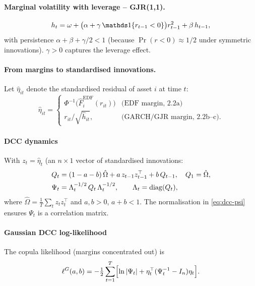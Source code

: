 \paragraph{Marginal volatility with leverage -- GJR(1,1).}
\begin{equation}\label{eq:gjr}
h_t=\omega+\bigl(\alpha+\gamma\,\indic\{r_{t-1}<0\}\bigr)r_{t-1}^{2}+\beta\,h_{t-1},
\end{equation}
with persistence $\alpha+\beta+\gamma/2<1$ (because $\Pr(r<0)\approx 1/2$ under
symmetric innovations). $\gamma>0$ captures the leverage effect.

\paragraph{From margins to standardised innovations.}
Let $\hat\eta_{it}$ denote the standardised residual of asset $i$ at time $t$:
\[
\hat\eta_{it}=
\begin{cases}
\Phi^{-1}\!\bigl(\hat F_{i}^{\text{EDF}}(r_{it})\bigr)& \text{(EDF margin, 2.2a)}\\[2pt]
r_{it}/\sqrt{\hat h_{it}}, & \text{(GARCH/GJR margin, 2.2b--c)}.
\end{cases}
\]

\paragraph{DCC dynamics}

With $z_t=\hat\eta_t$ (an $n\times 1$ vector of standardised innovations:
\begin{align}
Q_t &=(1-a-b)\,\hat\Omega+a\,z_{t-1}z_{t-1}^\top+b\,Q_{t-1},\quad Q_1=\hat\Omega,\label{eq:dcc-Q}\\
\Psi_t &=\Lambda_t^{-1/2}\,Q_t\,\Lambda_t^{-1/2},\qquad \Lambda_t=\operatorname{diag}(Q_t),\label{eq:dcc-psi}
\end{align}
where $\hat\Omega=\frac{1}{T}\sum_t z_tz_t^\top$ and $a,b>0$, $a+b<1$. The
normalisation in \eqref{eq:dcc-psi} ensures $\Psi_t$ is a correlation matrix.

\paragraph{Gaussian DCC log-likelihood}
The copula likelihood (margins concentrated out) is
\begin{equation}\label{eq:dcc-LL-G}
\ell^G(a,b)=-\tfrac12\sum_{t=1}^{T}\Bigl[\ln|\Psi_t|+\eta_t^\top(\Psi_t^{-1}-I_n)\eta_t\Bigr].
\end{equation}

